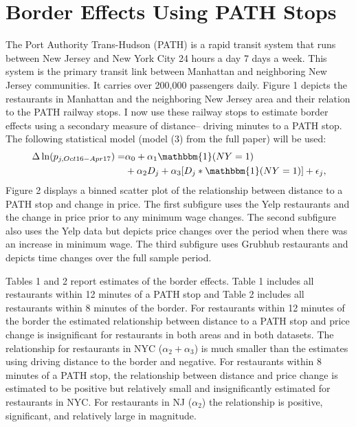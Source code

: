 \documentclass[11pt]{article}
\begin{document}
\section{Border Effects Using PATH Stops}

The Port Authority Trans-Hudson (PATH) is a rapid transit system that runs between New Jersey and New York City 24 hours a day 7 days a week. This system is the primary transit link between Manhattan and neighboring New Jersey communities. It carries over 200,000 passengers daily. Figure 1 depicts the restaurants in Manhattan and the neighboring New Jersey area and their relation to the PATH railway stops. I now use these railway stops to estimate border effects using a secondary measure of distance-- driving minutes to a PATH stop. The following statistical model (model (3) from the full paper) will be used:
\begin{equation}
\begin{split}
\Delta \ln (p_{j,Oct16-Apr17})  = & \alpha_0 + \alpha_1  \mathbbm{1}(NY=1)  \\
& + \alpha_2 D_{j} + \alpha_3[D_j * \mathbbm{1}(NY=1)]  + \epsilon_{j}, 
\end{split}
\end{equation}
Figure 2 displays a binned scatter plot of the relationship between distance to a PATH stop and change in price. The first subfigure uses the Yelp restaurants and the change in price prior to any minimum wage changes. The second subfigure also uses the Yelp data but depicts price changes over the period when there was an increase in minimum wage. The third subfigure uses Grubhub restaurants and depicts time changes over the full sample period. 

Tables 1 and 2 report estimates of the border effects. Table 1 includes all restaurants within 12 minutes of a PATH stop and Table 2 includes all restaurants within 8 minutes of the border. For restaurants within 12 minutes of the border the estimated relationship between distance to a PATH stop and price change is insignificant for restaurants in both areas and in both datasets. The relationship for restaurants in NYC ($\alpha_2 + \alpha_3$) is much smaller than the estimates using driving distance to the border and negative. For restaurants within 8 minutes of a PATH stop, the relationship between distance and price change is estimated to be positive but relatively small and insignificantly estimated for restaurants in NYC. For restaurants in NJ ($\alpha_2$) the relationship is positive, significant, and relatively large in magnitude. 
\end{document}
